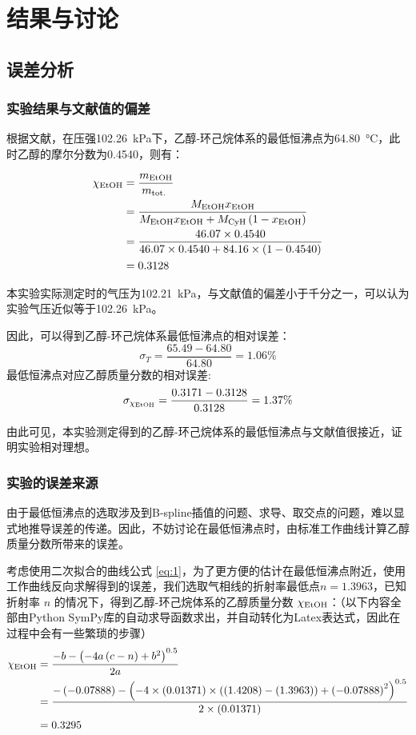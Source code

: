 \section{结果与讨论}

\subsection{误差分析}

\subsubsection{实验结果与文献值的偏差}

根据文献\cite{haynes2016crc}，在压强\SI{102.26}{kPa}下，乙醇-环己烷体系的最低恒沸点为\SI{64.80}{\celsius}，此
时乙醇的摩尔分数为0.4540，则有：

$$
\begin{aligned}
\chi_{\ce{EtOH}} & =\frac{m_{\ce{EtOH}}}{m_{\text {tot. }}} \\
& =\frac{M_{\ce{EtOH}} x_{\ce{EtOH}}}{M_{\ce{EtOH}} x_{\ce{EtOH}}+M_{\ce{CyH}}\left(1-x_{\ce{EtOH}}\right)} \\
& =\frac{46.07 \times 0.4540}{46.07 \times 0.4540+84.16 \times(1-0.4540)} \\
& =0.3128
\end{aligned}
$$

本实验实际测定时的气压为\SI{102.21}{kPa}，与文献值的偏差小于千分之一，可以认为实验气压近似等于\SI{102.26}{kPa}。

因此，可以得到乙醇-环己烷体系最低恒沸点的相对误差：
\[
\sigma_T = \frac{65.49-64.80}{64.80} = 1.06\%
\]
最低恒沸点对应乙醇质量分数的相对误差:
\[
\sigma_{\chi_{\rm{EtOH}}} = \frac{0.3171-0.3128}{0.3128}=1.37\%
\]

由此可见，本实验测定得到的乙醇-环己烷体系的最低恒沸点与文献值很接近，证明实验相对理想。

\subsubsection{实验的误差来源}

由于最低恒沸点的选取涉及到B-spline插值的问题、求导、取交点的问题，难以显式地推导误差的传递。因此，不妨讨论在最低恒沸点时，由标准工作曲线计算乙醇质量分数所带来的误差。

考虑使用二次拟合的曲线公式 \eqref{eq:1}，为了更方便的估计在最低恒沸点附近，使用工作曲线反向求解得到的误差，我们选取气相线的折射率最低点$n=1.3963$，已知折射率 $n$ 的情况下，得到乙醇-环己烷体系的乙醇质量分数 $\chi_{\rm{EtOH}}$：（以下内容全部由Python SymPy库的自动求导函数求出，并自动转化为Latex表达式，因此在过程中会有一些繁琐的步骤）
\begin{equation*}
\begin{aligned}
    \chi_{\rm{EtOH}}&=\frac{- b - \left(- 4 a \left(c - n\right) + b^{2}\right)^{0.5}}{2 a}\\
    &=\frac{- \left(-0.07888\right) - \left(- 4 \times \left(0.01371\right) \times \left(\left(1.4208\right) - \left(1.3963\right)\right) + \left(-0.07888\right)^{2}\right)^{0.5}}{2 \times \left(0.01371\right)}\\
    &=0.3295\ 
\end{aligned}
\end{equation*}

